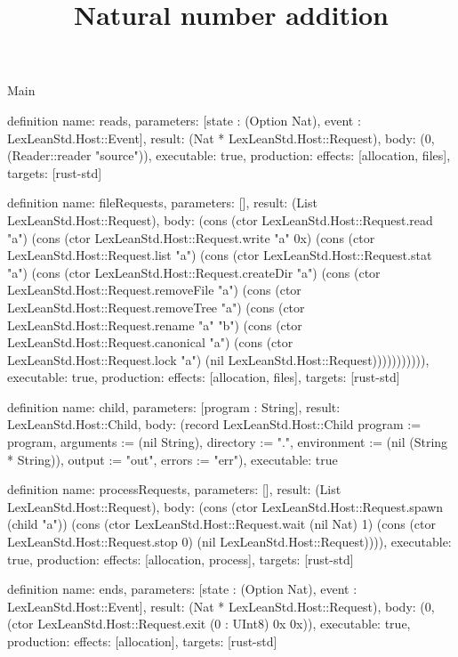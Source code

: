\begin{lexlean}{Main}
\title{Natural number addition}
\begin{semanticmodule}
definition{
  name: reads,
  parameters: [state : (Option Nat), event : LexLeanStd.Host::Event],
  result: (Nat * LexLeanStd.Host::Request),
  body: (0, (Reader::reader "source")),
  executable: true,
  production: {effects: [allocation, files], targets: [rust-std]}
}

definition{
  name: fileRequests,
  parameters: [],
  result: (List LexLeanStd.Host::Request),
  body: (cons (ctor LexLeanStd.Host::Request.read "a") (cons (ctor LexLeanStd.Host::Request.write "a" 0x) (cons (ctor LexLeanStd.Host::Request.list "a") (cons (ctor LexLeanStd.Host::Request.stat "a") (cons (ctor LexLeanStd.Host::Request.createDir "a") (cons (ctor LexLeanStd.Host::Request.removeFile "a") (cons (ctor LexLeanStd.Host::Request.removeTree "a") (cons (ctor LexLeanStd.Host::Request.rename "a" "b") (cons (ctor LexLeanStd.Host::Request.canonical "a") (cons (ctor LexLeanStd.Host::Request.lock "a") (nil LexLeanStd.Host::Request))))))))))),
  executable: true,
  production: {effects: [allocation, files], targets: [rust-std]}
}

definition{
  name: child,
  parameters: [program : String],
  result: LexLeanStd.Host::Child,
  body: (record LexLeanStd.Host::Child {program := program, arguments := (nil String), directory := ".", environment := (nil (String * String)), output := "out", errors := "err"}),
  executable: true
}

definition{
  name: processRequests,
  parameters: [],
  result: (List LexLeanStd.Host::Request),
  body: (cons (ctor LexLeanStd.Host::Request.spawn (child "a")) (cons (ctor LexLeanStd.Host::Request.wait (nil Nat) 1) (cons (ctor LexLeanStd.Host::Request.stop 0) (nil LexLeanStd.Host::Request)))),
  executable: true,
  production: {effects: [allocation, process], targets: [rust-std]}
}

definition{
  name: ends,
  parameters: [state : (Option Nat), event : LexLeanStd.Host::Event],
  result: (Nat * LexLeanStd.Host::Request),
  body: (0, (ctor LexLeanStd.Host::Request.exit (0 : UInt8) 0x 0x)),
  executable: true,
  production: {effects: [allocation], targets: [rust-std]}
}


\end{semanticmodule}
\end{lexlean}
